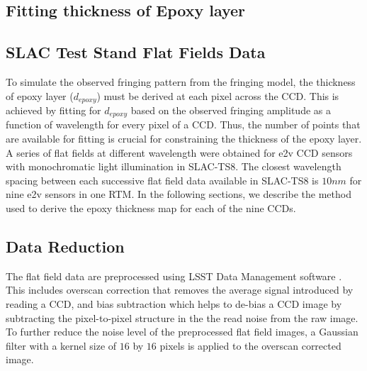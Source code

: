 \documentclass[twocolumn]{aastex63} %
\begin{document}
\begin{CJK*}{UTF8}{gbsn}
\section{Fitting thickness of Epoxy layer} \label{sec:Frining_fitting}

\subsection{SLAC Test Stand Flat Fields Data} \label{subsec:SLAC-TS8}

To simulate the observed fringing pattern from the fringing model, the thickness of epoxy layer ($d_{epoxy}$) must be derived at each pixel across the CCD. This is achieved by fitting for $d_{epoxy}$ based on the observed fringing amplitude as a function of wavelength for every pixel of a CCD. Thus, the number of points that are available for fitting is crucial for constraining the thickness of the epoxy layer.
A series of flat fields at different wavelength were obtained for e2v CCD sensors with monochromatic light illumination in SLAC-TS8. The closest wavelength spacing between each successive flat field data available in SLAC-TS8 is $10nm$ for nine e2v sensors in one RTM. 
In the following sections, we describe the method used to derive the epoxy thickness map for each of the nine CCDs.

\subsection{Data Reduction} \label{subsec: data reduction}
The flat field data are preprocessed using LSST Data Management software \citep{Juri17,Axelrod10}. This includes overscan correction that removes the average signal introduced by reading a CCD, and bias subtraction which helps to de-bias a CCD image by subtracting the pixel-to-pixel structure in the the read noise from the raw image. To further reduce the noise level of the preprocessed flat field images, a Gaussian filter with a kernel size of $16$ by $16$ pixels is applied to the overscan corrected image. 


\end{CJK*}
\end{document}
